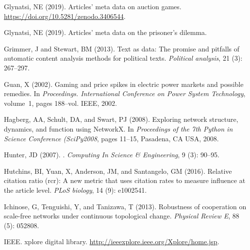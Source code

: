 \documentclass{article}
\theoremstyle{definition}
\begin{document}
\begin{thebibliography}{71}
    Glynatsi, NE (2019){}.
    \newblock Articles' meta data on auction games.
    \newblock \url{https://doi.org/10.5281/zenodo.3406544}.
    
    Glynatsi, NE (2019){}.
    \newblock Articles' meta data on the prisoner's dilemma.
    
    Grimmer, J and Stewart, BM (2013).
    \newblock Text as data: The promise and pitfalls of automatic content analysis
      methods for political texts.
    \newblock \emph{Political analysis}, 21 (3): 267--297.
    
    Guan, X (2002).
    \newblock Gaming and price spikes in electric power markets and possible
      remedies.
    \newblock In \emph{Proceedings. International Conference on Power System
      Technology}, volume~1, pages 188--vol. IEEE, 2002.
    
    Hagberg, AA, Schult, DA, and Swart, PJ (2008).
    \newblock Exploring network structure, dynamics, and function using {NetworkX}.
    \newblock In \emph{Proceedings of the 7th Python in Science Conference
      (SciPy2008}, pages 11--15, Pasadena, CA USA, 2008.
    
    Hunter, JD (2007).
    .
    \newblock \emph{Computing In Science \& Engineering}, 9 (3):
      90--95.
    
    Hutchins, BI, Yuan, X, Anderson, JM, and Santangelo, GM (2016).
    \newblock Relative citation ratio (rcr): A new metric that uses citation rates
      to measure influence at the article level.
    \newblock \emph{PLoS biology}, 14 (9): e1002541.
    
    Ichinose, G, Tenguishi, Y, and Tanizawa, T (2013).
    \newblock Robustness of cooperation on scale-free networks under continuous
      topological change.
    \newblock \emph{Physical Review E}, 88 (5): 052808.
    
    IEEE.
     xplore digital library.
    \newblock \url{http://ieeexplore.ieee.org/Xplore/home.jsp}.
    

\end{thebibliography}
\end{document}

